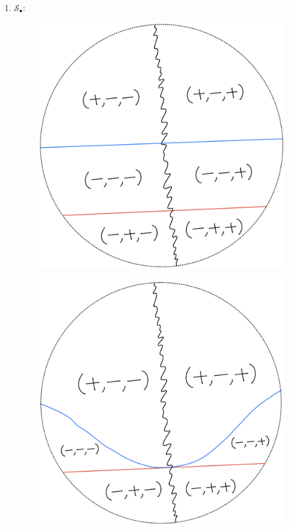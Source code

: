 \begin{definition}
\begin{enumerate}
\item $\mathcal{S}_\bullet$:
\begin{itemize}
\begin{figure}[H]
    \centering
    \includegraphics[scale = 0.95]{diagrams/lemma1/7.png} 
    \caption{}
    \label{fig:your-label}
\end{figure}
\begin{figure}[H]
    \centering
    \includegraphics[scale = 0.95]{diagrams/lemma1/8.png} 

\end{figure}
\end{itemize}
\end{enumerate}
\end{definition}
